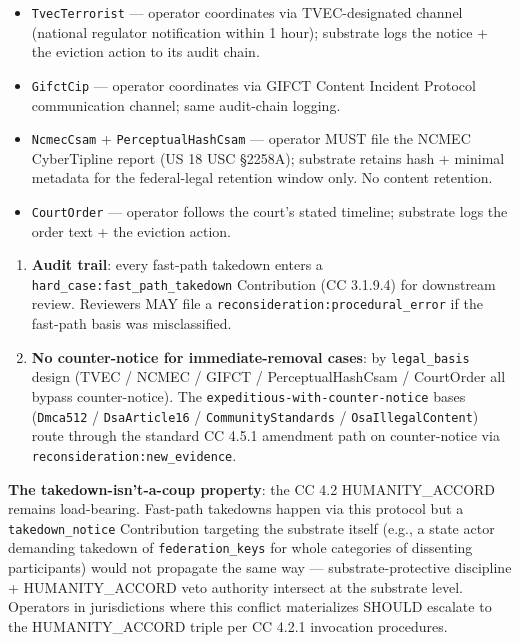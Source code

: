 \documentclass[11pt]{article}
\begin{document}
\begin{itemize}\setlength\itemsep{0pt}
\item \texttt{TvecTerrorist} — operator coordinates via TVEC-designated channel (national regulator notification within 1 hour); substrate logs the notice + the eviction action to its audit chain.
\item \texttt{GifctCip} — operator coordinates via GIFCT Content Incident Protocol communication channel; same audit-chain logging.
\item \texttt{NcmecCsam} + \texttt{PerceptualHashCsam} — operator MUST file the NCMEC CyberTipline report (US 18 USC §2258A); substrate retains hash + minimal metadata for the federal-legal retention window only. No content retention.
\item \texttt{CourtOrder} — operator follows the court's stated timeline; substrate logs the order text + the eviction action.
\end{itemize}

\begin{enumerate}\setlength\itemsep{0pt}
\item \textbf{Audit trail}: every fast-path takedown enters a \texttt{hard\_case:fast\_path\_takedown} Contribution (CC 3.1.9.4) for downstream review. Reviewers MAY file a \texttt{reconsideration:procedural\_error} if the fast-path basis was misclassified.
\item \textbf{No counter-notice for immediate-removal cases}: by \texttt{legal\_basis} design (TVEC / NCMEC / GIFCT / PerceptualHashCsam / CourtOrder all bypass counter-notice). The \texttt{expeditious-with-counter-notice} bases (\texttt{Dmca512} / \texttt{DsaArticle16} / \texttt{CommunityStandards} / \texttt{OsaIllegalContent}) route through the standard CC 4.5.1 amendment path on counter-notice via \texttt{reconsideration:new\_evidence}.
\end{enumerate}


\textbf{The takedown-isn't-a-coup property}: the CC 4.2 HUMANITY\_ACCORD remains load-bearing. Fast-path takedowns happen via this protocol but a \texttt{takedown\_notice} Contribution targeting the substrate itself (e.g., a state actor demanding takedown of \texttt{federation\_keys} for whole categories of dissenting participants) would not propagate the same way — substrate-protective discipline + HUMANITY\_ACCORD veto authority intersect at the substrate level. Operators in jurisdictions where this conflict materializes SHOULD escalate to the HUMANITY\_ACCORD triple per CC 4.2.1 invocation procedures.
\end{document}
